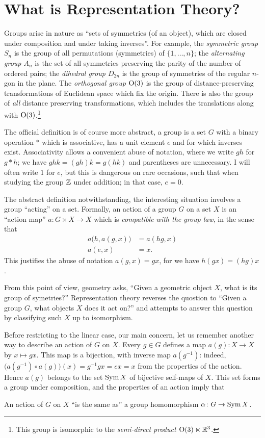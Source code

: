 \chapter{What is Representation Theory?}
Groups arise in nature as ``sets of symmetries (of an object), which are
closed under composition and under taking inverses''. For example, the
\emph{symmetric group \(S_n\)} is the group of all permutations
(symmetries) of \(\{1,\dotsc,n\}\); the \emph{alternating group \(A_n\)} is
the set of all symmetries preserving the parity of the number of ordered
pairs; the \emph{dihedral group \(D_{2n}\)} is the group of symmetries of
the regular \(n\)-gon in the plane. The \emph{orthogonal group
  \(\operatorname{O}(3)\)} is the group of distance-preserving transformations of
Euclidean space which fix the origin. There is also the group of \emph{all}
distance preserving transformations, which includes the translations along
with \(\operatorname{O}(3)\).\footnote{This group is isomorphic to the
  \emph{semi-direct product \(\operatorname{O}(3)\ltimes\mathbb{R}^3\)}.}

The official definition is of course more abstract, a group is a set \(G\)
with a binary operation \(*\) which is associative, has a unit element
\(e\) and for which inverses exist. Associativity allows a convenient abuse
of notation, where we write \(gh\) for \(g*h\); we have \(ghk=(gh)k=g(hk)\)
and parentheses are unnecessary. I will often write \(1\) for \(e\), but
this is dangerous on rare occasions, such that when studying the group
\(\mathbb{Z}\) under addition; in that case, \(e=0\).

The abstract definition notwithstanding, the interesting situation involves
a group ``acting'' on a set. Formally, an action of a group \(G\) on a set
\(X\) is an ``action map'' \(a\colon G\times X\to X\) which is
\emph{compatible with the group law}, in the sense that
\begin{align*}
  a\bigl(h,a(g,x)\bigr)&=a(hg,x)\\
  a(e,x)&=x.
\end{align*}
This justifies the abuse of notation \(a(g,x)=gx\), for we have
\(h(gx)=(hg)x\).

From this point of view, geometry asks, ``Given a geometric object \(X\),
what is its group of symetries?'' Representation theory reverses the
quostion to ``Given a group \(G\), what objects \(X\) does it act on?'' and
attempts to answer this question by classifying such \(X\) up to
isomorphism.

Before restricting to the linear case, our main concern, let us remember
another way to describe an action of \(G\) on \(X\). Every \(g\in G\)
defines a map \(a(g)\colon X\to X\) by \(x\mapsto gx\). This map is a
bijection, with inverse map \(a(g^{-1})\): indeed, \(\bigl(a(g^{-1})\circ
a(g)\bigr)(x)=g^{-1}gx=ex=x\) from the properties of the action. Hence
\(a(g)\) belongs to the set \(\operatorname{Sym} X\) of bijective self-maps of
\(X\). This set forms a group under composition, and the properties of an
action imply that
\begin{proposition}
  An action of \(G\) on \(X\) ``is the same as'' a group homomorphism
  \(\alpha\colon G\to\operatorname{Sym} X\).
\end{proposition}

